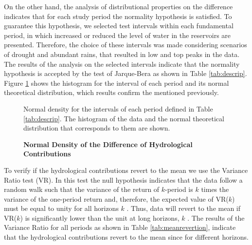 \documentclass[12pt,halfline,a4paper]{ouparticle}
\begin{document}
On the other hand, the analysis of distributional properties on the difference indicates that for each study period the normality hypothesis is satisfied. To guarantee this hypothesis, we selected test intervals within each fundamental period, in which increased or reduced the level of water in the reservoirs are presented. Therefore, the choice of these intervals was made considering scenarios of drought and abundant rains, that resulted in low and top peaks in the data. The results of the analysis on the selected intervals indicate that the normality hypothesis is accepted by the test of Jarque-Bera as shown in Table \ref{tab:descrip}. Figure \ref{fig:5} shows the histogram for the interval of each period and its normal theoretical distribution, which results confirm the mentioned previously. 

\begin{figure}[h]
	\centering
	\caption{\textbf{Normal Density of the Difference of Hydrological Contributions}} \label{fig:5}
	\medskip
	\begin{minipage}{0.8\textwidth} 
		{\footnotesize{Normal density for the intervals of each period defined in Table \ref{tab:descrip}. The histogram of the data and the normal theoretical distribution that corresponds to them are shown.\par}}
	\end{minipage}
\end{figure}

To verify if the hydrological contributions revert to the mean we use the Variance Ratio test (VR). In this test the null hypothesis indicates that the data follow a random walk such that the variance of the return of $k$-period is $k$ times the variance of the one-period return and, therefore, the expected value of VR($k$) must be equal to unity for all horizons $k$ \citep{Malliaropulos1999}. Thus, data will revert to the mean if VR($k$) is significantly lower than the unit at long horizons, $k$ \citep{Malliaropulos1999}. The results of the Variance Ratio for all periods as shown in Table \ref{tab:meanrevertion}, indicate that the hydrological contributions revert to the mean since for different horizons.
\end{document}
